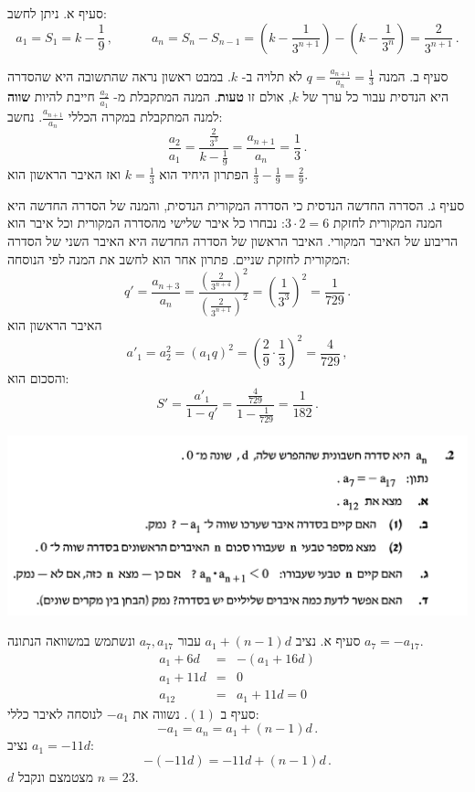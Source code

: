 \documentclass[12pt,a4paper]{article}
\begin{document}
סעיף א. ניתן לחשב:
\[
a_1=S_1=k-\frac{1}{9}\,, \quad\quad\quad a_n=S_{n}-S_{n-1}=\left(k-\frac{1}{3^{n+1}}\right)-\left(k-\frac{1}{3^{n}}\right)=\frac{2}{3^{n+1}}\,.
\]

סעיף ב. המנה
$q=\displaystyle\frac{a_{n+1}}{a_{n}}=\frac{1}{3}$
לא תלויה ב-%
$k$.
במבט ראשון נראה שהתשובה היא שהסדרה היא הנדסית עבור כל ערך של
$k$,
אולם זו
\textbf{טעות}.
המנה המתקבלת מ-%
$\displaystyle\frac{a_2}{a_1}$
חייבת להיות
\textbf{שווה}
למנה המתקבלת במקרה הכללי
$\displaystyle\frac{a_{n+1}}{a_{n}}$.
נחשב:
\[
\frac{a_2}{a_1}=\frac{\displaystyle\frac{2}{3^3}}{\displaystyle k-\frac{1}{9}} = \frac{a_{n+1}}{a_n}=\frac{1}{3}\,.
\]
הפתרון היחיד הוא
$k=\frac{1}{3}$
ואז האיבר הראשון הוא
$\frac{1}{3}-\frac{1}{9}=\frac{2}{9}$.

סעיף ג. הסדרה החדשה הנדסית כי הסדרה המקורית הנדסית, והמנה של הסדרה החדשה היא המנה המקורית לחזקת
$3\cdot 2=6$:
נבחרו כל איבר שלישי מהסדרה המקורית וכל איבר הוא הריבוע של האיבר המקורי. האיבר הראשון של הסדרה החדשה היא האיבר השני של הסדרה המקורית לחזקת שניים. פתרון אחר הוא לחשב את המנה לפי הנוסחה:
\[
q'=\frac{a_{n+3}}{a_n}=\frac{\left(\frac{2}{3^{n+4}}\right)^2}     {\left(\frac{2}{3^{n+1}}\right)^2}=\left(\frac{1}{3^3}\right)^2=\frac{1}{729}\,.
\]
האיבר הראשון הוא
\[
a'_1 = a_2^2=\left(a_1q\right)^2=\left(\frac{2}{9}\cdot\frac{1}{3}\right)^2=\frac{4}{729}\,,
\]
והסכום הוא:
\[
S'=\frac{a'_1}{1-q'}=
\frac{\displaystyle\frac{4}{729}}{1-\displaystyle\frac{1}{729}}= \frac{1}{182}\,.
\]


\textbf{}

\begin{center}
\includegraphics[width=.95\textwidth]{winter-2018-2}
\end{center}


סעיף א. נציב 
$a_1+(n-1)d$
עבור 
$a_7,a_{17}$
ונשתמש במשוואה הנתונה
$a_7=-a_{17}$.
\begin{eqnarray*}
a_1+6d &=& -(a_1+16d)\\
a_1+11d &=& 0\\
a_{12} &=&a_1+11d = 0
\end{eqnarray*}
סעיף ב
$(1)$.
נשווה את
$-a_1$
לנוסחה לאיבר כללי:
\[
-a_1 = a_n = a_1 + (n-1)d\,.
\]
נציב
$a_1=-11d$:
\[
-(-11d) = -11d + (n-1)d\,.
\]
$d$
מצטמצם ונקבל
$n=23$.
\end{document}
